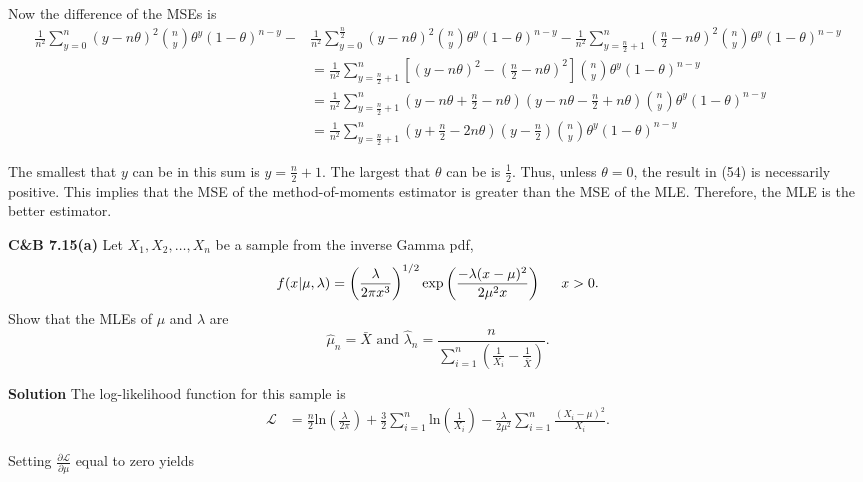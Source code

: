 \documentclass{article}
\newcommand{\mybox}{%
    \collectbox{%
        \setlength{\fboxsep}{1pt}%
        \fbox{\BOXCONTENT}%
    }%
}
\begin{document}
\noindent Now the difference of the MSEs is
\pagebreak
\begin{align}
\frac{1}{n^2}\sum\limits_{y=0}^n (y-n\theta)^2{n\choose y}\theta^y(1-\theta)^{n-y} - &\frac{1}{n^2}\sum\limits_{y=0}^{\frac{n}{2}}(y- n\theta)^2{n\choose y}\theta^y(1-\theta)^{n-y} - \frac{1}{n^2}\sum\limits_{y=\frac{n}{2}+1}^n\left(\frac{n}{2} - n\theta\right)^2{n \choose y}\theta^y(1-\theta)^{n-y} \\
&= \frac{1}{n^2}\sum\limits_{y=\frac{n}{2}+1}^n\left[(y-n\theta)^2 - \left(\frac{n}{2}-n\theta\right)^2\right]{n\choose y}\theta^y(1-\theta)^{n-y} \\
&= \frac{1}{n^2}\sum\limits_{y=\frac{n}{2}+1}^n\left(y-n\theta+\frac{n}{2}-n\theta\right)\left(y-n\theta-\frac{n}{2}+n\theta\right){n\choose y}\theta^y(1-\theta)^{n-y} \\
&= \frac{1}{n^2}\sum\limits_{y=\frac{n}{2}+1}^n\left(y+\frac{n}{2}-2n\theta\right)\left(y-\frac{n}{2}\right){n\choose y}\theta^y(1-\theta)^{n-y}
\end{align}

\noindent The smallest that $y$ can be in this sum is $y=\frac{n}{2}+1$.  The largest that $\theta$ can be is $\frac{1}{2}$. Thus, unless $\theta = 0$, the result in (54) is necessarily positive.  This implies that the MSE of the method-of-moments estimator is greater than the MSE of the MLE.  Therefore, the MLE is the better estimator.    
\pagebreak

\noindent\mybox{\textbf{C\&B 7.15(a)}}  Let $X_1, X_2, \ldots, X_n$ be a sample from the inverse Gamma pdf, $$f(x|\mu, \lambda) = \left(\frac{\lambda}{2\pi x^3}\right)^{1/2}\exp\left(\frac{-\lambda(x-\mu)^2}{2\mu^2x}\right) \hspace{5mm} x > 0.$$ Show that the MLEs of $\mu$ and $\lambda$ are $$\hat{\mu}_n = \bar{X} \text{ and } \hat{\lambda}_n = \frac{n}{\sum\limits_{i=1}^n\left(\frac{1}{X_i} - \frac{1}{\bar{X}}\right)}.$$

\vspace{5mm}

\noindent\mybox{\textbf{Solution}} The log-likelihood function for this sample is 
\begin{align}
\mathscr{L} &= \frac{n}{2}\text{ln}\left(\frac{\lambda}{2\pi}\right) + \frac{3}{2}\sum\limits_{i=1}^{n}\text{ln}\left(\frac{1}{X_i}\right) - \frac{\lambda}{2\mu^2}\sum\limits_{i=1}^{n}\frac{(X_i-\mu)^2}{X_i}.
\end{align}

\noindent Setting $\frac{\partial\mathscr{L}}{\partial\mu}$ equal to zero yields
\end{document}
